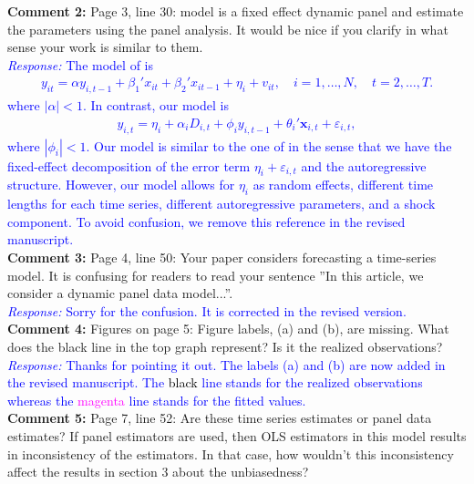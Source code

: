 \documentclass[12pt]{article}
\newcommand{\response}[1]{\noindent \textcolor{blue}{\emph{Response:} #1}}
\begin{document}
{\bf Comment 2:} Page 3, line 30: \citet{blundell1998initial} model is a fixed effect dynamic panel and estimate the parameters using the panel analysis. It would be nice if you clarify in what sense your work is similar to them. \\

\response{The model of \citet{blundell1998initial} is
\begin{align*}
  y_{it} = \alpha y_{i, t-1} + \beta_1'x_{it} + \beta_2'x_{it-1} + \eta_i + v_{it}, \quad i = 1, \ldots, N, \quad t = 2, \ldots, T.
\end{align*}
where $|\alpha|<1$. In contrast, our model is
\begin{align*}
 y_{i,t} =\eta_i +\alpha_i D_{i,t} + \phi_i y_{i, t-1} + \theta_i'\mathbf{x}_{i,t} + \varepsilon_{i,t},
\end{align*}
where $|\phi_i| < 1$. Our model is similar to the one of \citet{blundell1998initial}  in the sense that we have the fixed-effect decomposition of the error term $\eta_i +\varepsilon_{i,t}$ and the autoregressive structure. However, our model allows for $\eta_i$ as random effects, different time lengths for each time series, different autoregressive parameters, and a shock component. To avoid confusion, we  remove this reference in the revised manuscript.}\\

{\bf Comment 3:} Page 4, line 50: Your paper considers forecasting a time-series model. It is confusing for readers to read your sentence ”In this article, we consider a dynamic panel data model...''.\\

\response{Sorry for the confusion. It is corrected  in the revised version.}\\

{\bf  Comment 4:} Figures on page 5: Figure labels, (a) and (b), are missing. What does the black line in the top graph represent? Is it the realized observations?\\

\response{Thanks for pointing it out. The labels (a) and (b) are now added in the revised manuscript.   The \textcolor{black}{black} line stands for the realized observations whereas the \textcolor{magenta}{magenta} line stands for the fitted values.} \\

{\bf Comment 5:} Page 7, line 52: Are these time series estimates or panel data estimates? If panel estimators are used, then OLS estimators in this model results in inconsistency of the estimators. In that case, how wouldn't this inconsistency affect the results in section 3 about the unbiasedness? \\
\end{document}
